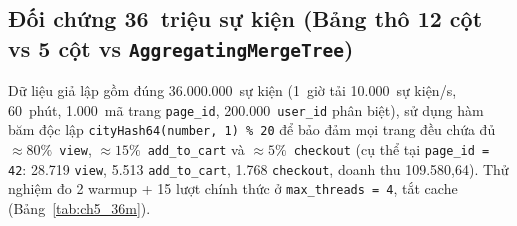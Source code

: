 \documentclass[13pt,a4paper]{report}
\begin{document}
\subsection{Đối chứng 36~triệu sự kiện (Bảng thô 12 cột vs 5 cột vs \texorpdfstring{\texttt{AggregatingMergeTree}}{AggregatingMergeTree})}
Dữ liệu giả lập gồm đúng 36.000.000~sự kiện (1~giờ tải 10.000~sự kiện/s, 60~phút, 1.000~mã trang \texttt{page\_\allowbreak{}id}, 200.000~\texttt{user\_\allowbreak{}id} phân biệt), sử dụng hàm băm độc lập \texttt{cityHash64(\allowbreak{}number, 1) \% 20} để bảo đảm mọi trang đều chứa đủ $\approx 80\%$~\texttt{view}, $\approx 15\%$~\texttt{add\_\allowbreak{}to\_\allowbreak{}cart} và $\approx 5\%$~\texttt{checkout} (cụ thể tại \texttt{page\_\allowbreak{}id = 42}: 28.719 \texttt{view}, 5.513 \texttt{add\_\allowbreak{}to\_\allowbreak{}cart}, 1.768 \texttt{checkout}, doanh thu 109.580,64). Thử nghiệm đo 2 warmup + 15 lượt chính thức ở \texttt{max\_\allowbreak{}threads = 4}, tắt cache (Bảng~\ref{tab:ch5_36m}).
\end{document}
